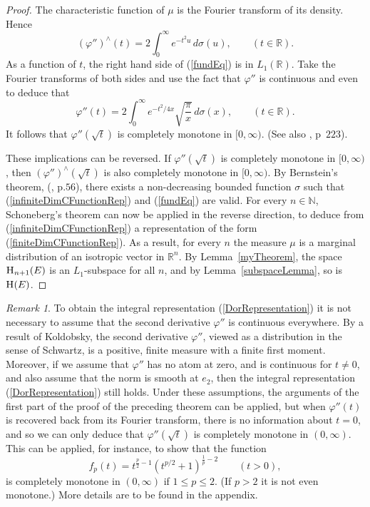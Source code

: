 \documentclass{article}[1100]
\theoremstyle{definition}
\theoremstyle{remark}
\newtheorem{remark}[theorem]{Remark}
\newcommand\Ren[1]{\mathbb{R}^{#1}}
\newcommand\ar{\mathbb{R}}
\newcommand\mySpaceH[1]{\textsc{H}(#1)}
\newcommand\mySpace[2]{\textsc{H}_{#1}(#2)}
\begin{document}
\begin{proof}
The characteristic function of $\mu$ is the Fourier transform of its  density. Hence
\begin{equation}\label{fundEq}
(\varphi'')^{\wedge}(t)=2\int_0^{\infty}e^{-t^2u}\,d\sigma(u), \qquad (t\in\ar).
\end{equation}
As a function of $t$, the right hand side of (\ref{fundEq}) is in $L_1(\ar)$. Take the Fourier transforms of both sides and
use the fact that $\varphi''$ is continuous and even to deduce that 
\[ \varphi''(t)=2\int_0^{\infty}e^{-t^2/4x}\sqrt{\frac{\pi}{x}}\,d\sigma(x), \qquad (t\in\ar).\]
It follows that $\varphi''(\sqrt{t})$ is completely monotone in $[0,\infty)$. (See also \cite{BN}, p~$223$).

\medskip

These implications can be reversed. If $\varphi''(\sqrt{t})$ is completely monotone in $[0,\infty)$, then $(\varphi'')^{\wedge}(\sqrt{t})$ is also completely monotone in $[0,\infty)$.
By Bernstein's theorem, (\cite{Bernstein1928}, p.$56$), there exists a non-decreasing bounded function $\sigma$ such that
(\ref{infiniteDimCFunctionRep}) and (\ref{fundEq}) are valid. For every $n\in\mathbb{N}$, Schoneberg's theorem can now be
applied in the reverse direction, to deduce  from (\ref{infiniteDimCFunctionRep}) a representation of the form (\ref{finiteDimCFunctionRep}). As a result,  for every $n$ the measure $\mu$ is a marginal distribution of an isotropic vector in $\Ren{n}$.  By Lemma~\ref{myTheorem}, the space $\mySpace{n+1}{E}$ is an $L_1$-subspace for all $n$, and by Lemma~\ref{subspaceLemma}, so is $\mySpaceH{E}$.
\end{proof}

\begin{remark}
To obtain the integral representation (\ref{DorRepresentation}) it is not necessary to assume that 
the second derivative $\varphi''$ is continuous everywhere. By a result of Koldobsky, the second derivative $\varphi''$,
viewed as a distribution in the sense of Schwartz, is a positive, finite measure with a finite first moment. Moreover,
if we assume that $\varphi''$ has no atom at zero, and is continuous for $t\neq 0$, and also assume that the norm is smooth
at $e_2$, then the integral representation (\ref{DorRepresentation}) still holds. Under these assumptions,
the arguments of the first part of the proof of the preceding theorem can be applied, but when $\varphi''(t)$ is recovered
back from its Fourier transform, there is no information about $t=0$, and so we can only deduce that $\varphi''(\sqrt{t})$ is
completely monotone in $(0,\infty)$. This can be applied, for instance, to show that the function
\[ f_p(t)=t^{\frac{p}{2}-1}(t^{p/2}+1)^{\frac{1}{p}-2}\qquad (t>0), \]
is completely monotone in $(0,\infty)$ if $1\leq p\leq 2$. (If $p>2$ it is not even monotone.) More details are to be found in the appendix.

\end{remark}
\end{document}
